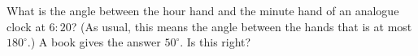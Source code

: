What is the angle between the hour hand and the minute hand of an analogue clock at $6{:}20$? (As usual, this means the angle between the hands that is at most $180^\circ$.) A book gives the answer $50^\circ$. Is this right?
